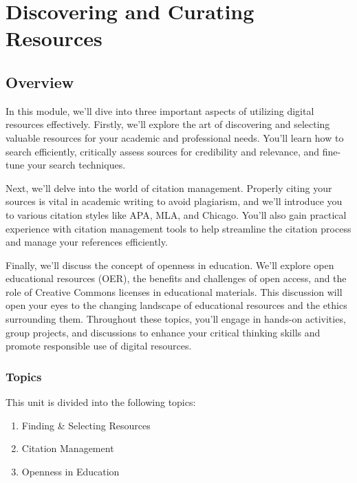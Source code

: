 \documentclass[
]{book}
\providecommand{\tightlist}{%
  \setlength{\itemsep}{0pt}\setlength{\parskip}{0pt}}
\theoremstyle{definition}
\theoremstyle{definition}
\theoremstyle{definition}
\theoremstyle{definition}
\theoremstyle{remark}
\begin{document}
\hypertarget{discovering-and-curating-resources}{%
\chapter{Discovering and Curating Resources}\label{discovering-and-curating-resources}}

\hypertarget{overview-1}{%
\section*{Overview}\label{overview-1}}

In this module, we'll dive into three important aspects of utilizing digital resources effectively. Firstly, we'll explore the art of discovering and selecting valuable resources for your academic and professional needs. You'll learn how to search efficiently, critically assess sources for credibility and relevance, and fine-tune your search techniques.

Next, we'll delve into the world of citation management. Properly citing your sources is vital in academic writing to avoid plagiarism, and we'll introduce you to various citation styles like APA, MLA, and Chicago. You'll also gain practical experience with citation management tools to help streamline the citation process and manage your references efficiently.

Finally, we'll discuss the concept of openness in education. We'll explore open educational resources (OER), the benefits and challenges of open access, and the role of Creative Commons licenses in educational materials. This discussion will open your eyes to the changing landscape of educational resources and the ethics surrounding them. Throughout these topics, you'll engage in hands-on activities, group projects, and discussions to enhance your critical thinking skills and promote responsible use of digital resources.

\hypertarget{topics-1}{%
\subsection*{Topics}\label{topics-1}}

This unit is divided into the following topics:

\begin{enumerate}
\def\labelenumi{\arabic{enumi}.}
\tightlist
\item
  Finding \& Selecting Resources\\
\item
  Citation Management\\
\item
  Openness in Education
\end{enumerate}
\end{document}
